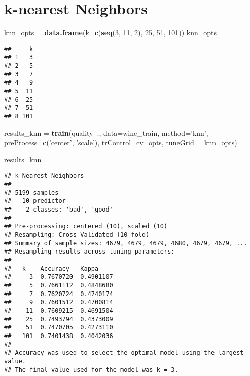 \documentclass[]{book}
\newenvironment{Shaded}{\begin{snugshade}}{\end{snugshade}}
\newcommand{\KeywordTok}[1]{\textcolor[rgb]{0.13,0.29,0.53}{\textbf{#1}}}
\newcommand{\DataTypeTok}[1]{\textcolor[rgb]{0.13,0.29,0.53}{#1}}
\newcommand{\DecValTok}[1]{\textcolor[rgb]{0.00,0.00,0.81}{#1}}
\newcommand{\StringTok}[1]{\textcolor[rgb]{0.31,0.60,0.02}{#1}}
\newcommand{\OperatorTok}[1]{\textcolor[rgb]{0.81,0.36,0.00}{\textbf{#1}}}
\newcommand{\NormalTok}[1]{#1}
\begin{document}
\hypertarget{k-nearest-neighbors}{%
\chapter{k-nearest Neighbors}\label{k-nearest-neighbors}}

\begin{Shaded}
\begin{Highlighting}[]
\NormalTok{knn_opts =}\StringTok{ }\KeywordTok{data.frame}\NormalTok{(}\DataTypeTok{k=}\KeywordTok{c}\NormalTok{(}\KeywordTok{seq}\NormalTok{(}\DecValTok{3}\NormalTok{, }\DecValTok{11}\NormalTok{, }\DecValTok{2}\NormalTok{), }\DecValTok{25}\NormalTok{, }\DecValTok{51}\NormalTok{, }\DecValTok{101}\NormalTok{))}
\NormalTok{knn_opts}
\end{Highlighting}
\end{Shaded}

\begin{verbatim}
##     k
## 1   3
## 2   5
## 3   7
## 4   9
## 5  11
## 6  25
## 7  51
## 8 101
\end{verbatim}

\begin{Shaded}
\begin{Highlighting}[]
\NormalTok{results_knn =}\StringTok{ }\KeywordTok{train}\NormalTok{(quality}\OperatorTok{~}\NormalTok{., }
                    \DataTypeTok{data=}\NormalTok{wine_train, }
                    \DataTypeTok{method=}\StringTok{'knn'}\NormalTok{,}
                    \DataTypeTok{preProcess=}\KeywordTok{c}\NormalTok{(}\StringTok{'center'}\NormalTok{, }\StringTok{'scale'}\NormalTok{), }
                    \DataTypeTok{trControl=}\NormalTok{cv_opts,}
                    \DataTypeTok{tuneGrid =}\NormalTok{ knn_opts)}

\NormalTok{results_knn}
\end{Highlighting}
\end{Shaded}

\begin{verbatim}
## k-Nearest Neighbors 
## 
## 5199 samples
##   10 predictor
##    2 classes: 'bad', 'good' 
## 
## Pre-processing: centered (10), scaled (10) 
## Resampling: Cross-Validated (10 fold) 
## Summary of sample sizes: 4679, 4679, 4679, 4680, 4679, 4679, ... 
## Resampling results across tuning parameters:
## 
##   k    Accuracy   Kappa    
##     3  0.7670720  0.4901107
##     5  0.7661112  0.4848680
##     7  0.7620724  0.4740174
##     9  0.7601512  0.4700814
##    11  0.7609215  0.4691504
##    25  0.7493794  0.4373009
##    51  0.7470705  0.4273110
##   101  0.7401438  0.4042036
## 
## Accuracy was used to select the optimal model using the largest value.
## The final value used for the model was k = 3.
\end{verbatim}
\end{document}
